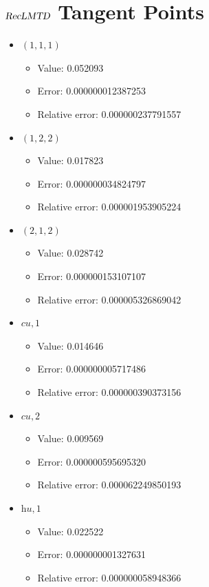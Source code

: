\documentclass{article}%
\begin{document}
\section{$\textsl{RecLMTD}$ Tangent Points}%
\thispagestyle{plain}%
\begin{itemize}%
	\item $(1, 1, 1)$%
	\begin{itemize}%
		\item Value: 0.052093%
		\item Error: 0.000000012387253%
		\item Relative error: 0.000000237791557%
	\end{itemize}%
	\item $(1, 2, 2)$%
	\begin{itemize}%
		\item Value: 0.017823%
		\item Error: 0.000000034824797%
		\item Relative error: 0.000001953905224%
	\end{itemize}%
	\item $(2, 1, 2)$%
	\begin{itemize}%
		\item Value: 0.028742%
		\item Error: 0.000000153107107%
		\item Relative error: 0.000005326869042%
	\end{itemize}%
	\item $\textit{cu},1$%
	\begin{itemize}%
		\item Value: 0.014646%
		\item Error: 0.000000005717486%
		\item Relative error: 0.000000390373156%
	\end{itemize}%
	\item $\textit{cu},2$%
	\begin{itemize}%
		\item Value: 0.009569%
		\item Error: 0.000000595695320%
		\item Relative error: 0.000062249850193%
	\end{itemize}%
	\item $\textit{hu},1$%
	\begin{itemize}%
		\item Value: 0.022522%
		\item Error: 0.000000001327631%
		\item Relative error: 0.000000058948366%
	\end{itemize}%
\end{itemize}%
\end{document}
